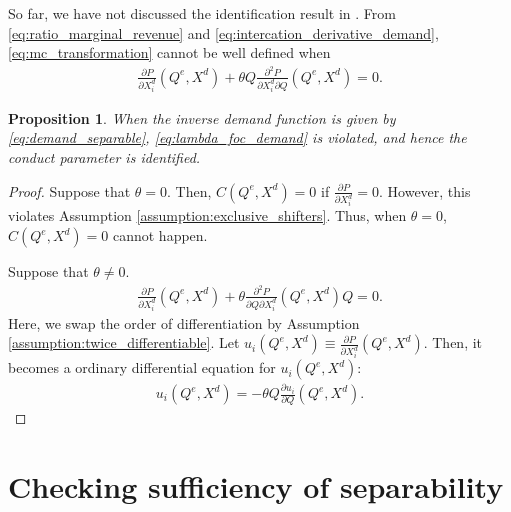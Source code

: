 \documentclass[11pt, a4paper]{article}
\newtheorem{proposition}{Proposition}
\theoremstyle{remark}
\begin{document}
So far, we have not discussed the identification result in \citet{lau1982identifying}.
From \eqref{eq:ratio_marginal_revenue} and \eqref{eq:intercation_derivative_demand}, \eqref{eq:mc_transformation} cannot be well defined when 
\begin{align}
    \frac{\partial P}{\partial X^{d}_i}(Q^e, X^{d}) + \theta Q\frac{\partial^2 P}{\partial X^{d}_{i}\partial Q}(Q^e, X^{d}) = 0.
\end{align}








\begin{proposition}
    When the inverse demand function is given by \eqref{eq:demand_separable}, \eqref{eq:lambda_foc_demand} is violated, and hence the conduct parameter is identified.
\end{proposition}

\begin{proof}
    Suppose that $\theta = 0$.
    Then, $C(Q^e, X^{d}) = 0$ if $\frac{\partial P}{\partial X^{d}_{i}} =  0$.
    However, this violates Assumption \ref{assumption:exclusive_shifters}.
    Thus, when $\theta = 0$, $C(Q^e, X^{d}) = 0$ cannot happen.


    Suppose that $\theta \ne 0$.
    \begin{align}
        \frac{\partial P}{\partial X^{d}_i}(Q^e, X^{d}) + \theta\frac{\partial^2 P}{\partial Q\partial X^{d}_{i}}(Q^e, X^{d})Q = 0.
    \end{align}
    Here, we swap the order of differentiation by Assumption \ref{assumption:twice_differentiable}.
    Let $u_i(Q^e, X^{d}) \equiv \frac{\partial P}{\partial X^{d}_i}(Q^e, X^{d})$.
    Then, it becomes a ordinary differential equation for $u_i(Q^e, X^{d})$:
    \begin{align}
       u_i(Q^e, X^{d}) = -\theta Q\frac{\partial u_i}{\partial Q}(Q^e, X^{d}).
    \end{align}



\end{proof}

















\section{Checking sufficiency of separability}
\end{document}
